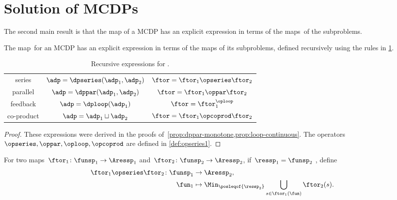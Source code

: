
\section{Solution of MCDPs}
\label{sec:Solution-of-Monotone}

The second main result is that the map \ftor of a MCDP has an explicit expression in terms of the maps~\ftor of the subproblems.

\begin{theorem}
    \label{thm:CDP-solvig}
    The map~\ftor for an MCDP has an explicit expression in terms of the maps \ftor of its subproblems, defined recursively using the rules in \cref{tab:correspondence}.
\end{theorem}

\begin{table}[h]
    \caption{Recursive expressions for \ftor.}
    \label{tab:correspondence}
    \centering{}\setlength\extrarowheight{5pt}\normalsize
    \begin{tabular}{ccc}
        series     & $\adp=\dpseries(\adp_{1},\adp_{2})$ & $\ftor=\ftor_{1}\opseries\ftor_{2}$\tabularnewline
        parallel   & $\adp=\dppar(\adp_{1},\adp_{2})$    & $\ftor=\ftor_{1}\oppar\ftor_{2}$\tabularnewline
        feedback   & $\adp=\dploop(\adp_{1})$            & $\ftor=\ftor_{1}^{\oploop}$\tabularnewline
        co-product & $\adp=\adp_{1}\sqcup\adp_{2}$       & $\ftor=\ftor_{1}\opcoprod\ftor_{2}$\tabularnewline
    \end{tabular}
\end{table}

\begin{proof}
    These expressions were derived in the proofs of~\cref{prop:dppar-monotone,prop:loop-continuous}.
    The operators $\opseries,\oppar,\oploop,\opcoprod$ are defined in \cref{def:opseries1}.
\end{proof}
\begin{definition}
    \label{def:opseries1}
    For two maps~$\ftor_{1}\colon\funsp_{1}\rightarrow\Aressp_{1}$
    and~$\ftor_{2}\colon\funsp_{2}\rightarrow\Aressp_{2}$, if~$\ressp_{1}=\funsp_{2}$
    , define
    \begin{align*}
        {\displaystyle \ftor_{1}\opseries\ftor_{2}\colon\funsp_{1}}
                 & \rightarrow\Aressp_{2}, \\
        \fun_{1} & \mapsto\Min_{\posleqof{\ressp_{2}}}\bigcup_{s\in\ftor_{1}(\fun)}\ftor_{2}(s).
    \end{align*}
\end{definition}

